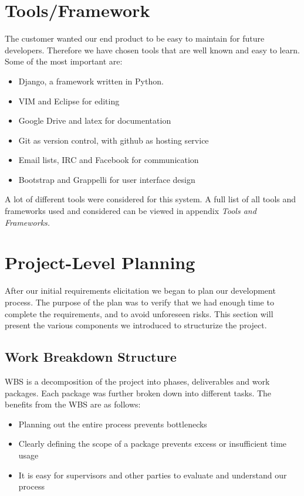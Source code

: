 \section{Tools/Framework}
The customer wanted our end product to be easy to maintain for future
developers. Therefore we have chosen tools that are well known and easy
to learn. Some of the most important are:

\begin{itemize}
    \item Django, a framework written in Python.
    \item VIM and Eclipse for editing
    \item Google Drive and latex for documentation
    \item Git as version control, with github as hosting service
    \item Email lists, IRC and Facebook for communication
    \item Bootstrap and Grappelli for user interface design
\end{itemize}
A lot of different tools were considered for this system. A full list of all
tools and frameworks used and considered can be viewed in appendix
\textit{Tools and Frameworks.}

\section{Project-Level Planning}
After our initial requirements elicitation we began to plan our
development process. The purpose of the plan was to verify that we had
enough time to complete the requirements, and to avoid unforeseen
risks. This section will present the various components we introduced
to structurize the project.

\subsection{Work Breakdown Structure}
WBS is a decomposition of the project into phases, deliverables and work
packages. Each package was further broken down into different tasks.
The benefits from the WBS are as follows:
\begin{itemize}
    \item Planning out the entire process prevents bottlenecks
    \item Clearly defining the scope of a package prevents excess or
        insufficient time usage
    \item It is easy for supervisors and other parties to evaluate and
        understand our process
\end{itemize}

